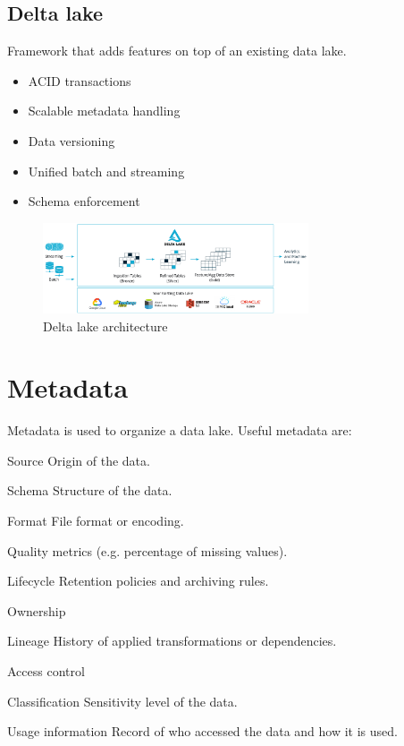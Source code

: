 \subsection{Delta lake} 
Framework that adds features on top of an existing data lake.
\begin{itemize}
    \item ACID transactions
    \item Scalable metadata handling
    \item Data versioning
    \item Unified batch and streaming
    \item Schema enforcement
\end{itemize}
\begin{figure}[H]
    \centering
    \includegraphics[width=0.7\textwidth]{img/delta_lake.png}
    \caption{Delta lake architecture}
\end{figure}


\section{Metadata}
Metadata is used to organize a data lake.
Useful metadata are:
\begin{descriptionlist}
    \item[Source] Origin of the data.
    \item[Schema] Structure of the data.
    \item[Format] File format or encoding.
    \item[Quality metrics] (e.g. percentage of missing values).
    \item[Lifecycle] Retention policies and archiving rules.
    \item[Ownership] 
    \item[Lineage] History of applied transformations or dependencies.
    \item[Access control] 
    \item[Classification] Sensitivity level of the data.
    \item[Usage information] Record of who accessed the data and how it is used.
\end{descriptionlist}